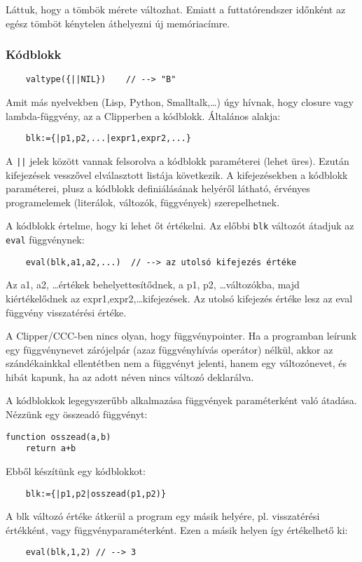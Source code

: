 Láttuk, hogy a tömbök mérete változhat. 
Emiatt a futtatórendszer időnként az egész tömböt 
kénytelen áthelyezni új memóriacímre.

\subsubsection{Kódblokk}

\begin{verbatim}
    valtype({||NIL})    // --> "B"
\end{verbatim}

Amit más nyelvekben (Lisp, Python, Smalltalk,\ldots) úgy hívnak, hogy closure vagy
lambda-függvény, az a Clipperben a kódblokk. Általános alakja: 
\begin{verbatim}
    blk:={|p1,p2,...|expr1,expr2,...}
\end{verbatim}
A \verb!||! jelek között vannak felsorolva a kódblokk paraméterei (lehet üres).
Ezután kifejezések vesszővel elválasztott listája következik. A kifejezésekben 
a kódblokk paraméterei, plusz a kódblokk definiálásának helyéről látható, érvényes
programelemek (literálok, változók, függvények) szerepelhetnek. 

A kódblokk értelme, hogy ki lehet őt értékelni. Az előbbi \verb!blk!
változót átadjuk az \verb!eval! függvénynek:
\begin{verbatim}
    eval(blk,a1,a2,...)  // --> az utolsó kifejezés értéke
\end{verbatim}
Az a1, a2, \ldots értékek behelyettesítődnek, a p1, p2, \ldots változókba,
majd kiértékelődnek az expr1,expr2,\ldots kifejezések. Az utolsó kifejezés
értéke lesz az eval függvény visszatérési értéke.

A Clipper/CCC-ben nincs olyan, hogy függvénypointer. Ha a programban leírunk 
egy függvénynevet  zárójelpár (azaz függvényhívás operátor) nélkül, 
akkor az szándékainkkal ellentétben nem a függvényt jelenti, hanem egy változónevet, 
és hibát kapunk, ha az adott néven nincs változó deklarálva. 

A kódblokkok legegyszerűbb alkalmazása függvények paraméterként való átadása.
Nézzünk egy összeadó függvényt:
\begin{verbatim}
function osszead(a,b)
    return a+b
\end{verbatim}
Ebből készítünk egy kódblokkot:
\begin{verbatim}
    blk:={|p1,p2|osszead(p1,p2)}
\end{verbatim}
A blk változó értéke átkerül a program egy másik helyére, 
pl. visszatérési értékként, vagy függvény\-paraméterként. 
Ezen a másik helyen így értékelhető ki:
\begin{verbatim}
    eval(blk,1,2) // --> 3
\end{verbatim}

